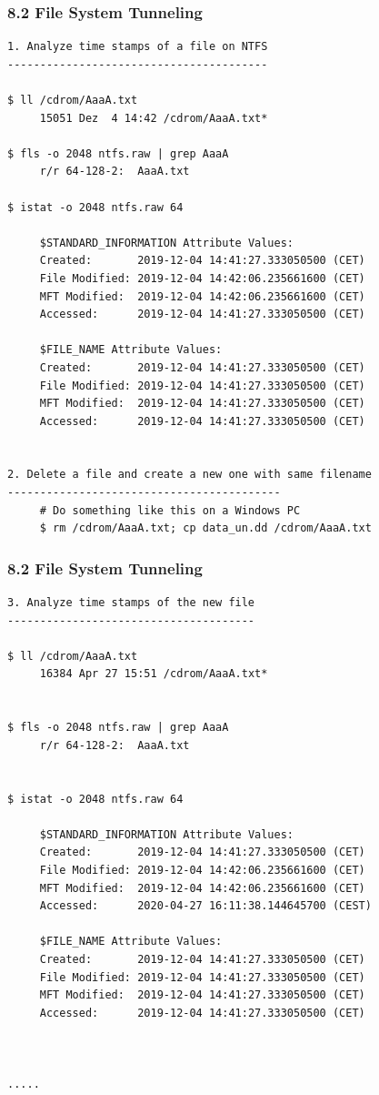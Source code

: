 \begin{frame}[fragile]
  \frametitle{8.2 File System Tunneling}
  \begin{lstlisting}[basicstyle=\tiny]
1. Analyze time stamps of a file on NTFS
----------------------------------------

$ ll /cdrom/AaaA.txt
     15051 Dez  4 14:42 /cdrom/AaaA.txt*

$ fls -o 2048 ntfs.raw | grep AaaA
     r/r 64-128-2:	AaaA.txt

$ istat -o 2048 ntfs.raw 64

     $STANDARD_INFORMATION Attribute Values:
     Created:   	2019-12-04 14:41:27.333050500 (CET)
     File Modified:	2019-12-04 14:42:06.235661600 (CET)
     MFT Modified:	2019-12-04 14:42:06.235661600 (CET)
     Accessed:   	2019-12-04 14:41:27.333050500 (CET)

     $FILE_NAME Attribute Values:
     Created:   	2019-12-04 14:41:27.333050500 (CET)
     File Modified:	2019-12-04 14:41:27.333050500 (CET)
     MFT Modified:	2019-12-04 14:41:27.333050500 (CET)
     Accessed:  	2019-12-04 14:41:27.333050500 (CET)


2. Delete a file and create a new one with same filename
------------------------------------------
     # Do something like this on a Windows PC
     $ rm /cdrom/AaaA.txt; cp data_un.dd /cdrom/AaaA.txt
  \end{lstlisting}
\end{frame}


\begin{frame}[fragile]
  \frametitle{8.2 File System Tunneling}
  \begin{lstlisting}[basicstyle=\tiny]
3. Analyze time stamps of the new file
--------------------------------------

$ ll /cdrom/AaaA.txt 
     16384 Apr 27 15:51 /cdrom/AaaA.txt*


$ fls -o 2048 ntfs.raw | grep AaaA
     r/r 64-128-2:	AaaA.txt


$ istat -o 2048 ntfs.raw 64

     $STANDARD_INFORMATION Attribute Values:
     Created:   	2019-12-04 14:41:27.333050500 (CET)
     File Modified:	2019-12-04 14:42:06.235661600 (CET)
     MFT Modified:	2019-12-04 14:42:06.235661600 (CET)
     Accessed:  	2020-04-27 16:11:38.144645700 (CEST)

     $FILE_NAME Attribute Values:
     Created:   	2019-12-04 14:41:27.333050500 (CET)
     File Modified:	2019-12-04 14:41:27.333050500 (CET)
     MFT Modified:	2019-12-04 14:41:27.333050500 (CET)
     Accessed:  	2019-12-04 14:41:27.333050500 (CET)

  
  
.....
  \end{lstlisting}
\end{frame}


